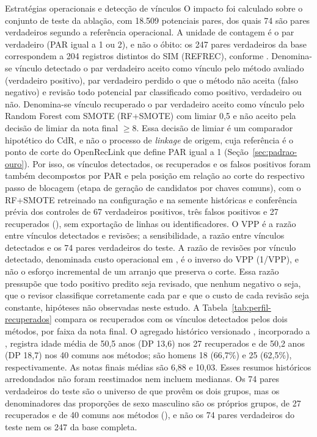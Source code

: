 \begin{chapter}{Estratégias operacionais e detecção de vínculos}
O impacto foi calculado sobre o conjunto de teste da ablação, com 18.509 potenciais pares, dos quais 74 são pares verdadeiros segundo a referência operacional. A unidade de contagem é o par verdadeiro (PAR igual a 1 ou 2), e não o óbito: os 247 pares verdadeiros da base correspondem a 204 registros distintos do SIM (REFREC), conforme . Denomina-se vínculo detectado o par verdadeiro aceito como vínculo pelo método avaliado (verdadeiro positivo), par verdadeiro perdido o que o método não aceita (falso negativo) e revisão todo potencial par classificado como positivo, verdadeiro ou não. Denomina-se vínculo recuperado o par verdadeiro aceito como vínculo pelo Random Forest com SMOTE (RF+SMOTE) com limiar 0,5 e não aceito pela decisão de limiar da nota final $\geq 8$. Essa decisão de limiar é um comparador hipotético do CdR, e não o processo de \textit{linkage} de origem, cuja referência é o ponto de corte do OpenRecLink que define PAR igual a 1 (Seção~\ref{sec:padrao-ouro}). Por isso, os vínculos detectados, os recuperados e os falsos positivos foram também decompostos por PAR e pela posição em relação ao corte do respectivo passo de blocagem (etapa de geração de candidatos por chaves comuns), com o RF+SMOTE retreinado na configuração e na semente históricas e conferência prévia dos controles de 67 verdadeiros positivos, três falsos positivos e 27 recuperados (), sem exportação de linhas ou identificadores. O VPP é a razão entre vínculos detectados e revisões; a sensibilidade, a razão entre vínculos detectados e os 74 pares verdadeiros do teste. A razão de revisões por vínculo detectado, denominada custo operacional em , é o inverso do VPP (1/VPP), e não o esforço incremental de um arranjo que preserva o corte. Essa razão pressupõe que todo positivo predito seja revisado, que nenhum negativo o seja, que o revisor classifique corretamente cada par e que o custo de cada revisão seja constante, hipóteses não observadas neste estudo. A Tabela~\ref{tab:perfil-recuperados} compara os recuperados com os vínculos detectados pelos dois métodos, por faixa da nota final. O agregado histórico versionado , incorporado a , registra idade média de 50,5 anos (DP 13,6) nos 27 recuperados e de 50,2 anos (DP 18,7) nos 40 comuns aos métodos; são homens 18 (66,7\%) e 25 (62,5\%), respectivamente. As notas finais médias são 6,88 e 10,03. Esses resumos históricos arredondados não foram reestimados nem incluem medianas. Os 74 pares verdadeiros do teste são o universo de que provêm os dois grupos, mas os denominadores das proporções de sexo masculino são os próprios grupos, de 27 recuperados e de 40 comuns aos métodos (), e não os 74 pares verdadeiros do teste nem os 247 da base completa.


\end{chapter}
